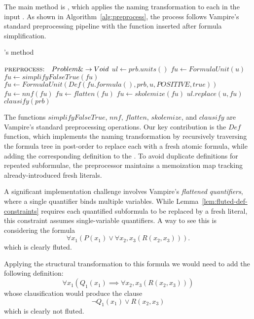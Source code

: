 The main method is , which applies the naming transformation to each  in the input .
As shown in Algorithm~\ref{alg:preprocess}, the process follows Vampire's standard preprocessing pipeline with the  function inserted after formula simplification.

\begin{algorithm}[H]
    \caption{'s  method}\label{alg:preprocess}
    \begin{algorithmic}[1]
        \Statex{}  \(\textsc{preprocess:} \quad Problem\& \to Void\)
            \State{} \(ul \gets prb.units()\)
              \State{} \(fu \gets FormulaUnit(u)\)
              \State{} \(fu \gets simplifyFalseTrue(fu)\)
              \State{} \(fu \gets FormulaUnit(Def(fu.formula(),prb,u,POSITIVE,true))\)
              \State{} \(fu \gets nnf(fu)\)
              \State{} \(fu \gets flatten(fu)\)
              \State{} \(fu \gets skolemize(fu)\)
              \State{} \(ul.replace(u,fu)\)
            \EndFor{}
            \State{} \(clausify(prb)\)
        \EndFunction{}
    \end{algorithmic}
\end{algorithm}

The functions \(simplifyFalseTrue\), \(nnf\), \(flatten\), \(skolemize\), and \(clausify\) are Vampire's standard preprocessing operations.
Our key contribution is the \(Def\) function, which implements the naming transformation by recursively traversing the formula tree in post-order to replace each  with a fresh atomic formula, while adding the corresponding definition to the .
To avoid duplicate definitions for repeated subformulae, the preprocessor maintains a memoization map tracking already-introduced fresh literals.

A significant implementation challenge involves Vampire's \emph{flattened quantifiers}, where a single quantifier binds multiple variables.
While Lemma~\ref{lem:fluted-def-constraints} requires each quantified subformula to be replaced by a fresh literal, this constraint assumes single-variable quantifiers.
A way to see this is considering the formula
\[
\forall x_1 (P(x_1) \lor \forall x_2,x_3 (R(x_2,x_3))).
\]
which is clearly fluted.

Applying the structural transformation to this formula we would need to add the following definition:
\[
  \forall x_1 (Q_1(x_1) \implies \forall x_2,x_3 (R(x_2,x_3)))
\]
whose clausification would produce the clause
\[
\neg Q_1(x_1) \lor R(x_2,x_3)
\]
which is clearly not fluted.

